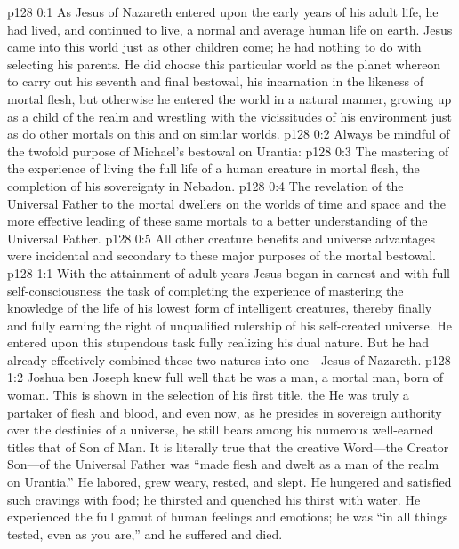 \author{Midwayer Commission}
\vs p128 0:1 As Jesus of Nazareth entered upon the early years of his adult life, he had lived, and continued to live, a normal and average human life on earth. Jesus came into this world just as other children come; he had nothing to do with selecting his parents. He did choose this particular world as the planet whereon to carry out his seventh and final bestowal, his incarnation in the likeness of mortal flesh, but otherwise he entered the world in a natural manner, growing up as a child of the realm and wrestling with the vicissitudes of his environment just as do other mortals on this and on similar worlds.\plusone
\vs p128 0:2 Always be mindful of the twofold purpose of Michael’s bestowal on Urantia:
\pc \vs p128 0:3 \bibnobreakspace The mastering of the experience of living the full life of a human creature in mortal flesh, the completion of his sovereignty in Nebadon.
\pc \vs p128 0:4 \bibnobreakspace The revelation of the Universal Father to the mortal dwellers on the worlds of time and space and the more effective leading of these same mortals to a better understanding of the Universal Father.
\pc \vs p128 0:5 All other creature benefits and universe advantages were incidental and secondary to these major purposes of the mortal bestowal.
\vs p128 1:1 With the attainment of adult years Jesus began in earnest and with full self\hyp{}consciousness the task of completing the experience of mastering the knowledge of the life of his lowest form of intelligent creatures, thereby finally and fully earning the right of unqualified rulership of his self\hyp{}created universe. He entered upon this stupendous task fully realizing his dual nature. But he had already effectively combined these two natures into one---Jesus of Nazareth.
\vs p128 1:2 Joshua ben Joseph knew full well that he was a man, a mortal man, born of woman. This is shown in the selection of his first title, the  He was truly a partaker of flesh and blood, and even now, as he presides in sovereign authority over the destinies of a universe, he still bears among his numerous well\hyp{}earned titles that of Son of Man. It is literally true that the creative Word---the Creator Son---of the Universal Father was “made flesh and dwelt as a man of the realm on Urantia.” He labored, grew weary, rested, and slept. He hungered and satisfied such cravings with food; he thirsted and quenched his thirst with water. He experienced the full gamut of human feelings and emotions; he was “in all things tested, even as you are,” and he suffered and died.
